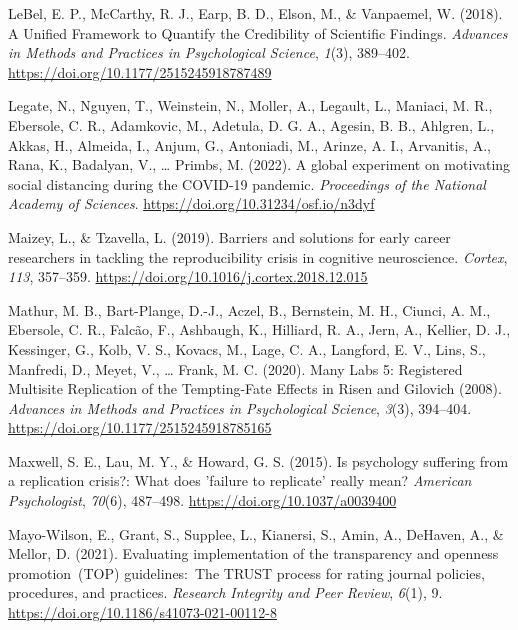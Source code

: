 \documentclass[
  man]{apa7}
\newlength{\cslhangindent}
\newlength{\cslentryspacingunit} %
\newenvironment{CSLReferences}[2] %
 {%
  \setlength{\parindent}{0pt}
  \ifodd #1
  \let\oldpar\par
  \def\par{\hangindent=\cslhangindent\oldpar}
  \fi
  \setlength{\parskip}{#2\cslentryspacingunit}
 }%
 {}
\begin{document}
\begin{CSLReferences}{1}{0}
\leavevmode{}%
LeBel, E. P., McCarthy, R. J., Earp, B. D., Elson, M., \& Vanpaemel, W. (2018). A Unified Framework to Quantify the Credibility of Scientific Findings. \emph{Advances in Methods and Practices in Psychological Science}, \emph{1}(3), 389--402. \url{https://doi.org/10.1177/2515245918787489}

\leavevmode{}%
Legate, N., Nguyen, T., Weinstein, N., Moller, A., Legault, L., Maniaci, M. R., Ebersole, C. R., Adamkovic, M., Adetula, D. G. A., Agesin, B. B., Ahlgren, L., Akkas, H., Almeida, I., Anjum, G., Antoniadi, M., Arinze, A. I., Arvanitis, A., Rana, K., Badalyan, V., \ldots{} Primbs, M. (2022). A global experiment on motivating social distancing during the COVID-19 pandemic. \emph{Proceedings of the National Academy of Sciences}. \url{https://doi.org/10.31234/osf.io/n3dyf}

\leavevmode{}%
Maizey, L., \& Tzavella, L. (2019). Barriers and solutions for early career researchers in tackling the reproducibility crisis in cognitive neuroscience. \emph{Cortex}, \emph{113}, 357--359. \url{https://doi.org/10.1016/j.cortex.2018.12.015}

\leavevmode{}%
Mathur, M. B., Bart-Plange, D.-J., Aczel, B., Bernstein, M. H., Ciunci, A. M., Ebersole, C. R., Falcão, F., Ashbaugh, K., Hilliard, R. A., Jern, A., Kellier, D. J., Kessinger, G., Kolb, V. S., Kovacs, M., Lage, C. A., Langford, E. V., Lins, S., Manfredi, D., Meyet, V., \ldots{} Frank, M. C. (2020). Many Labs 5: Registered Multisite Replication of the Tempting-Fate Effects in Risen and Gilovich (2008). \emph{Advances in Methods and Practices in Psychological Science}, \emph{3}(3), 394--404. \url{https://doi.org/10.1177/2515245918785165}

\leavevmode{}%
Maxwell, S. E., Lau, M. Y., \& Howard, G. S. (2015). Is psychology suffering from a replication crisis?: What does 'failure to replicate' really mean? \emph{American Psychologist}, \emph{70}(6), 487--498. \url{https://doi.org/10.1037/a0039400}

\leavevmode{}%
Mayo-Wilson, E., Grant, S., Supplee, L., Kianersi, S., Amin, A., DeHaven, A., \& Mellor, D. (2021). Evaluating implementation of the transparency and openness promotion~(TOP) guidelines:~The TRUST process for rating journal policies, procedures, and practices. \emph{Research Integrity and Peer Review}, \emph{6}(1), 9. \url{https://doi.org/10.1186/s41073-021-00112-8}


\end{CSLReferences}
\end{document}
